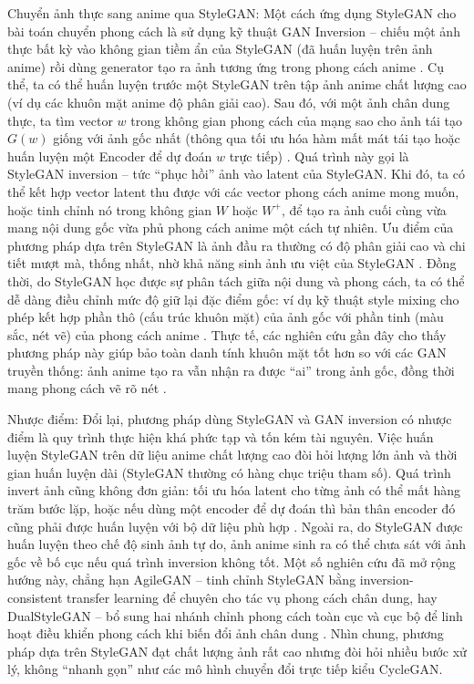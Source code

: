 Chuyển ảnh thực sang anime qua StyleGAN: Một cách ứng dụng StyleGAN cho bài toán chuyển phong
cách là sử dụng kỹ thuật GAN Inversion – chiếu một ảnh thực bất kỳ vào không gian tiềm ẩn của StyleGAN
(đã huấn luyện trên ảnh anime) rồi dùng generator tạo ra ảnh tương ứng trong phong cách anime \cite{Xia2022}.
Cụ thể, ta có thể huấn luyện trước một StyleGAN trên tập ảnh anime chất lượng cao (ví dụ các khuôn mặt
anime độ phân giải cao). Sau đó, với một ảnh chân dung thực, ta tìm vector $w$ trong không gian phong
cách của mạng sao cho ảnh tái tạo $G(w)$ giống với ảnh gốc nhất (thông qua tối ưu hóa hàm mất mát tái
tạo hoặc huấn luyện một Encoder để dự đoán $w$ trực tiếp) \cite{Richardson2021}. Quá trình này gọi là StyleGAN
inversion – tức “phục hồi” ảnh vào latent của StyleGAN. Khi đó, ta có thể kết hợp vector latent thu được với
các vector phong cách anime mong muốn, hoặc tinh chỉnh nó trong không gian $W$ hoặc $W^+$, để tạo
ra ảnh cuối cùng vừa mang nội dung gốc vừa phủ phong cách anime một cách tự nhiên. Ưu điểm của
phương pháp dựa trên StyleGAN là ảnh đầu ra thường có độ phân giải cao và chi tiết mượt mà, thống
nhất, nhờ khả năng sinh ảnh ưu việt của StyleGAN \cite{Karras2019, Karras2020}. Đồng thời, do StyleGAN học được sự phân tách giữa
nội dung và phong cách, ta có thể dễ dàng điều chỉnh mức độ giữ lại đặc điểm gốc: ví dụ kỹ thuật style
mixing cho phép kết hợp phần thô (cấu trúc khuôn mặt) của ảnh gốc với phần tinh (màu sắc, nét vẽ) của
phong cách anime \cite{Karras2019}. Thực tế, các nghiên cứu gần đây cho thấy phương pháp này giúp bảo toàn danh
tính khuôn mặt tốt hơn so với các GAN truyền thống: ảnh anime tạo ra vẫn nhận ra được “ai” trong ảnh
gốc, đồng thời mang phong cách vẽ rõ nét \cite{Xia2022}.

Nhược điểm: Đổi lại, phương pháp dùng StyleGAN và GAN inversion có nhược điểm là quy trình thực hiện
khá phức tạp và tốn kém tài nguyên. Việc huấn luyện StyleGAN trên dữ liệu anime chất lượng cao đòi hỏi
lượng lớn ảnh và thời gian huấn luyện dài (StyleGAN thường có hàng chục triệu tham số). Quá trình invert
ảnh cũng không đơn giản: tối ưu hóa latent cho từng ảnh có thể mất hàng trăm bước lặp, hoặc nếu dùng
một encoder để dự đoán thì bản thân encoder đó cũng phải được huấn luyện với bộ dữ liệu phù hợp \cite{Richardson2021}.
Ngoài ra, do StyleGAN được huấn luyện theo chế độ sinh ảnh tự do, ảnh anime sinh ra có thể chưa sát
với ảnh gốc về bố cục nếu quá trình inversion không tốt. Một số nghiên cứu đã mở rộng hướng này, chẳng
hạn AgileGAN \cite{Song2021} – tinh chỉnh StyleGAN bằng inversion-consistent transfer learning để
chuyên cho tác vụ phong cách chân dung, hay DualStyleGAN \cite{Yang2022} – bổ sung hai nhánh chỉnh
phong cách toàn cục và cục bộ để linh hoạt điều khiển phong cách khi biến đổi ảnh chân dung \cite{Yang2022}. Nhìn
chung, phương pháp dựa trên StyleGAN đạt chất lượng ảnh rất cao nhưng đòi hỏi nhiều bước xử lý, không
“nhanh gọn” như các mô hình chuyển đổi trực tiếp kiểu CycleGAN.


